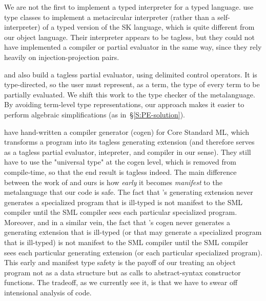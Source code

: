 We are not the first to implement a typed interpreter for a typed
language.   use type classes to implement a metacircular
interpreter (rather than a self\hyp interpreter) of a
typed version of the SK language, which is quite different from our
object language.  Their interpreter
appears to be tagless, but they could not have implemented a
compiler or partial evaluator in the same way, since they rely
heavily on injection\hyp projection pairs.

 and \citet{balat:tdpe-popl2004} also build
a tagless partial evaluator, using delimited control operators.  It is
type-directed, so the user must represent, as a term, the type of every
term to be partially evaluated.  We shift this work to the type checker
of the metalanguage.  By avoiding term-level type representations, our
approach makes it easier to perform algebraic simplifications (as
in~\S\ref{S:PE-solution}).

 have hand-written a compiler generator (cogen)
for Core Standard ML, which transforms a program into its tagless
generating extension (and therefore serves as a tagless partial
evaluator, intepreter, and compiler in our sense). They still have to
use the "universal type" at the cogen level, which is removed from
compile-time, so that the end result is tagless indeed.  The main
difference between the work of  and ours is how
\emph{early} it becomes \emph{manifest} to the metalanguage
that our code is safe.  The fact that
 's generating extension never generates a
specialized program that is ill-typed is not manifest to the SML
compiler until the SML compiler sees each particular specialized
program.  Moreover, and in a similar vein, the fact that
 's cogen never generates a generating extension
that is ill-typed (or that may generate a specialized program that is
ill-typed) is not manifest to the SML compiler until the SML compiler
sees each particular generating extension (or each particular
specialized program).  This early and manifest type safety is the
payoff of our treating an object program not as a data structure but
as calls to abstract-syntax constructor functions.  The tradeoff, as
we currently see it, is that we have to swear off intensional analysis
of code. 


